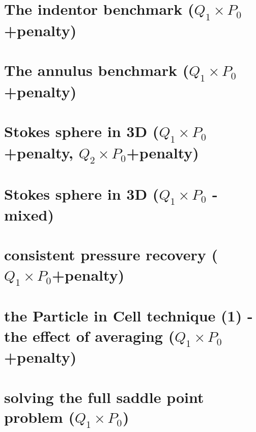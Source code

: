 \documentclass[a4paper,11pt]{report}
\begin{document}
\chapter{The indentor benchmark ($Q_1\times P_0$+penalty)\label{f08}} %
 
\chapter{The annulus benchmark ($Q_1\times P_0$+penalty) \label{f09}} %

\chapter{Stokes sphere in 3D ($Q_1 \times P_0$+penalty, $Q_2 \times P_0$+penalty)\label{f10}} %

\chapter{Stokes sphere in 3D ($Q_1\times P_0$ - mixed) \label{f11}} %

\chapter{consistent pressure recovery ($Q_1\times P_0$+penalty)\label{f12}} %

\chapter{the Particle in Cell technique (1) - the effect of averaging ($Q_1\times P_0$+penalty)\label{f13}} %

\chapter{solving the full saddle point problem ($Q_1\times P_0$) \label{f14}} %
\end{document}
